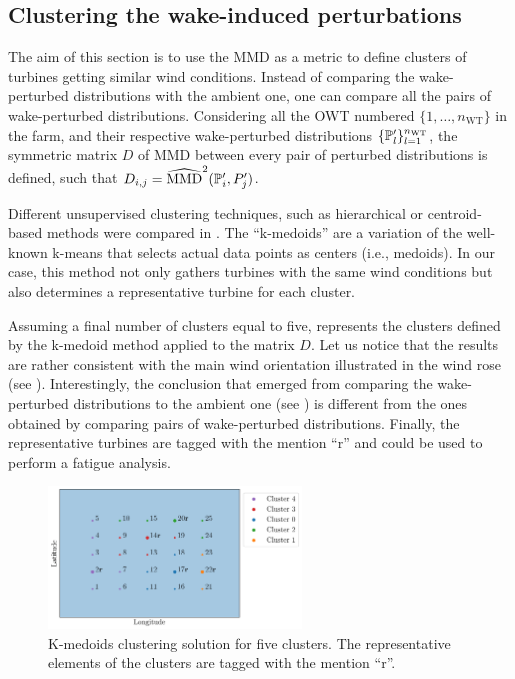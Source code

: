 \subsection{Clustering the wake-induced perturbations}

The aim of this section is to use the MMD as a metric to define clusters of turbines getting similar wind conditions. 
Instead of comparing the wake-perturbed distributions with the ambient one, one can compare all the pairs of wake-perturbed distributions. 
Considering all the OWT numbered $\{1, \dots, n_{\mathrm{WT}}\}$ in the farm, and their respective wake-perturbed distributions $\{\P_l'\}_{l=1}^{n_{\mathrm{WT}}}$, the symmetric matrix $D$ of MMD between every pair of perturbed distributions is defined, such that $D_{i, j} = \what{\mathrm{MMD}}^2(\P_i', P_j')$. 

Different unsupervised clustering techniques, such as hierarchical or centroid-based methods were compared in \citet{lovera_fekhari_2023}. 
The ``k-medoids'' \citep{park_2009} are a variation of the well-known k-means that selects actual data points as centers (i.e., medoids). 
In our case, this method not only gathers turbines with the same wind conditions but also determines a representative turbine for each cluster. 

Assuming a final number of clusters equal to five,  represents the clusters defined by the k-medoid method applied to the matrix $D$. 
Let us notice that the results are rather consistent with the main wind orientation illustrated in the wind rose (see ). 
Interestingly, the conclusion that emerged from comparing the wake-perturbed distributions to the ambient one (see ) is different from the ones obtained by comparing pairs of wake-perturbed distributions. 
Finally, the representative turbines are tagged with the mention ``r'' and could be used to perform a fatigue analysis. 


\begin{figure}
    \centering
    \includegraphics[width=0.6\textwidth]{part2/figures/WAKE/clusters_SB.png}
    \caption{K-medoids clustering solution for five clusters. The representative elements of the clusters are tagged with the mention ``r''.}
    \label{fig:kmedoids}
\end{figure}




